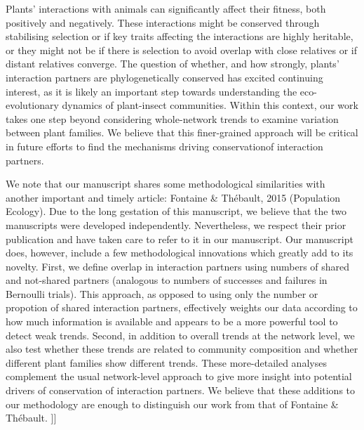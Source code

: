 \documentclass[12pt]{letter}
\begin{document}
\begin{letter}
\begin{enumerate}
		Plants' interactions with animals can significantly affect their fitness, both positively and negatively. These interactions might be conserved through stabilising selection or if key traits affecting the interactions are highly heritable, or they might not be if there is selection to avoid overlap with close relatives or if distant relatives converge. The question of whether, and how strongly, plants' interaction partners are phylogenetically conserved has excited continuing interest, as it is likely an important step towards understanding the eco-evolutionary dynamics of plant-insect communities. Within this context, our work takes one step beyond considering whole-network trends to examine variation between plant families. We believe that this finer-grained approach will be critical in future efforts to find the mechanisms driving conservationof interaction partners.



		We note that our manuscript shares some methodological similarities with another important and timely article: Fontaine \& Th\'{e}bault, 2015 (Population Ecology). Due to the long gestation of this manuscript, we believe that the two manuscripts were developed independently. Nevertheless, we respect their prior publication and have taken care to refer to it in our manuscript. Our manuscript does, however, include a few methodological innovations which greatly add to its novelty. First, we define overlap in interaction partners using numbers of shared and not-shared partners (analogous to numbers of successes and failures in Bernoulli trials). This approach, as opposed to using only the number or propotion of shared interaction partners, effectively weights our data according to how much information is available and appears to be a more powerful tool to detect weak trends. Second, in addition to overall trends at the network level, we also test whether these trends are related to community composition and whether different plant families show different trends. These more-detailed analyses complement the usual network-level approach to give more insight into potential drivers of conservation of interaction partners. We believe that these additions to our methodology are enough to distinguish our work from that of Fontaine \& Th\'{e}bault. ]]



	\end{enumerate}


\end{letter}
\end{document}
